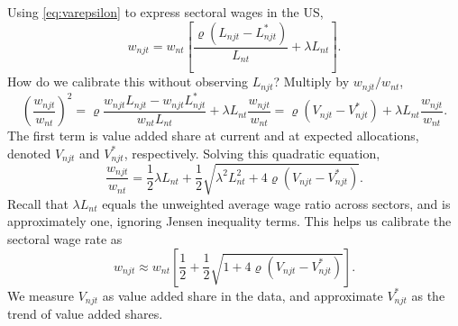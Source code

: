 \documentclass[12pt]{article}
\begin{document}
Using \eqref{eq:varepsilon} to express sectoral wages in the US,
\[
w_{njt} = w_{nt}
\left[
\frac {\varrho(L_{njt}-L_{njt}^*)}
	{L_{nt}}
+\lambda L_{nt}
\right].
\]
How do we calibrate this without observing $L_{njt}$? Multiply by $w_{njt}/w_{nt}$,
\[
\left(\frac {w_{njt}} {w_{nt}}\right)^2
= 
\varrho\frac {w_{njt}L_{njt}-w_{njt}L_{njt}^*}
	{w_{nt}L_{nt}}
+\lambda L_{nt}\frac {w_{njt}} {w_{nt}}
=\varrho (V_{njt} - V_{njt}^*)
+\lambda L_{nt}\frac {w_{njt}} {w_{nt}}.
\]
The first term is value added share at current and at expected allocations, denoted $V_{njt}$ and $V_{njt}^*$, respectively. Solving this quadratic equation,
\[
\frac {w_{njt}} {w_{nt}} = \frac12 \lambda L_{nt}
+\frac12 \sqrt{\lambda^2 L_{nt}^2 + 4\varrho (V_{njt}-V_{njt}^*)}.
\]
Recall that $\lambda L_{nt}$ equals the unweighted average wage ratio across sectors, and is approximately one, ignoring Jensen inequality terms. This helps us calibrate the sectoral wage rate as
\[
w_{njt} \approx w_{nt} \left[
\frac12
+\frac12 \sqrt{1 + 4\varrho (V_{njt}-V_{njt}^*)}
\right].
\]
We measure $V_{njt}$ as value added share in the data, and approximate $V_{njt}^*$ as the trend of value added shares.
\end{document}

